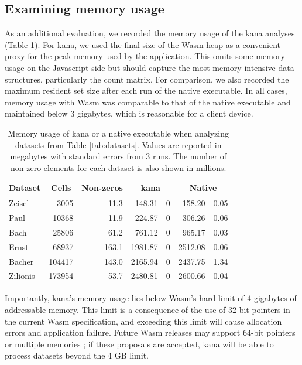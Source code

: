 \documentclass{article}
\begin{document}
\subsection{Examining memory usage}

As an additional evaluation, we recorded the memory usage of the kana analyses (Table \ref{tab:memory}).
For kana, we used the final size of the Wasm heap as a convenient proxy for the peak memory used by the application.
This omits some memory usage on the Javascript side but should capture the most memory-intensive data structures, particularly the count matrix.
For comparison, we also recorded the maximum resident set size after each run of the native executable.
In all cases, memory usage with Wasm was comparable to that of the native executable and maintained below 3 gigabytes,
which is reasonable for a client device.

\begin{table}
    \caption{Memory usage of kana or a native executable when analyzing datasets from Table \ref{tab:datasets}.
Values are reported in megabytes with standard errors from 3 runs.
The number of non-zero elements for each dataset is also shown in millions.}
\label{tab:memory}
\begin{center}
    \begin{tabular}{l r r r@{ $\pm$ }l r@{ $\pm$ }l}
\hline
        Dataset & \multicolumn{1}{c}{Cells} & \multicolumn{1}{c}{Non-zeros} & \multicolumn{2}{c}{kana} & \multicolumn{2}{c}{Native} \\
\hline
        Zeisel   & 3005  &  11.3 & 148.31 & 0 & 158.20 & 0.05 \\
        Paul     & 10368 &  11.9 & 224.87 & 0 & 306.26 & 0.06 \\
        Bach     & 25806 &  61.2 & 761.12 & 0 & 965.17 & 0.03 \\
        Ernst    & 68937 & 163.1 & 1981.87 & 0 & 2512.08 & 0.06 \\
        Bacher   & 104417& 143.0 & 2165.94 & 0 & 2437.75 & 1.34 \\
        Zilionis & 173954&  53.7 & 2480.81 & 0 & 2600.66 & 0.04 \\
\hline
\end{tabular}
\end{center}
\end{table}

Importantly, kana's memory usage lies below Wasm's hard limit of 4 gigabytes of addressable memory.
This limit is a consequence of the use of 32-bit pointers in the current Wasm specification,
and exceeding this limit will cause allocation errors and application failure.
Future Wasm releases may support 64-bit pointers \cite{wasm64} or multiple memories \cite{wasmmulti};
if these proposals are accepted, kana will be able to process datasets beyond the 4 GB limit.
\end{document}
